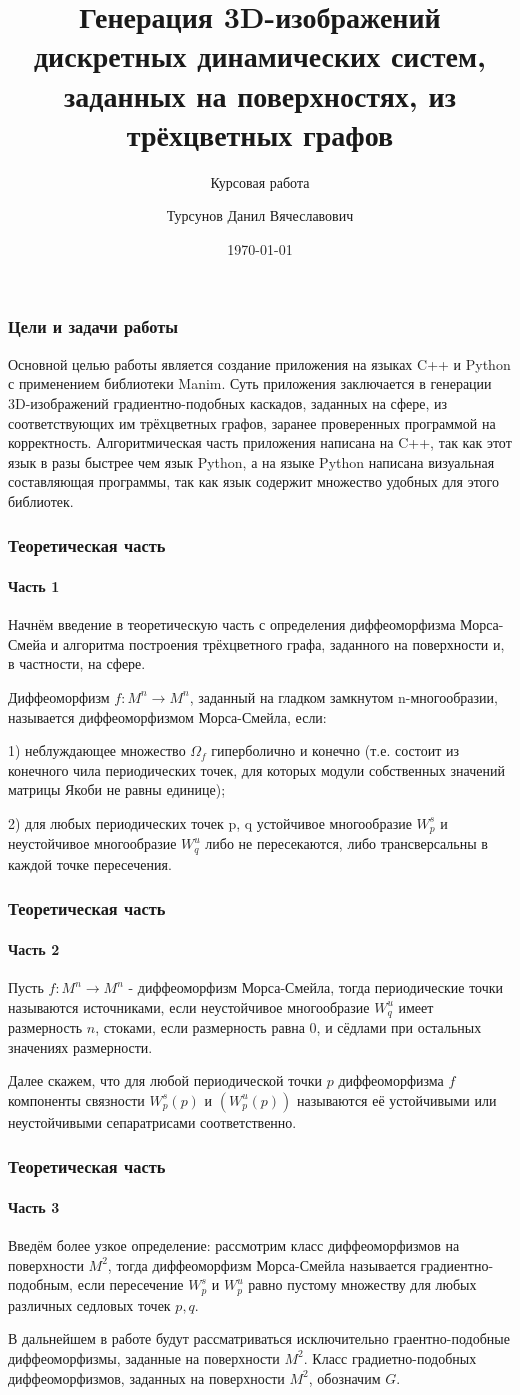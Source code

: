 \documentclass[aspectratio=169]{beamer}
\title[Заголовок]{Генерация 3D-изображений дискретных динамических систем, заданных на поверхностях, из трёхцветных графов}
\subtitle{Курсовая работа}
\author[Имя автора]{Турсунов Данил Вячеславович}
\institute{Образовательная программа "Фундаментальная математика"}
\date{\today}
\begin{document}

\frame[plain]{\titlepage}	%

\begin{frame}
\frametitle{Цели и задачи работы}
	Основной целью работы является создание приложения на языках C++ и Python с применением библиотеки Manim. Суть приложения заключается в генерации 3D-изображений градиентно-подобных каскадов, заданных на сфере, из соответствующих им трёхцветных графов, заранее проверенных программой на корректность. Алгоритмическая часть приложения написана на C++, так как этот язык в разы быстрее чем язык Python, а на языке Python написана визуальная составляющая программы, так как язык содержит множество удобных для этого библиотек.
\end{frame}
\begin{frame}
	\frametitle{Теоретическая часть}
	\framesubtitle{Часть 1}
	Начнём введение в теоретическую часть с определения диффеоморфизма Морса-Смейа и алгоритма построения трёхцветного графа, заданного на поверхности и, в частности, на сфере.
	\begin{definition}
		Диффеоморфизм $f: M^n \rightarrow M^n$, заданный на гладком замкнутом n-многообразии, называется диффеоморфизмом Морса-Смейла, если:
		\par 1) неблуждающее множество $\Omega_f$ гиперболично и конечно (т.е. состоит из конечного чила периодических точек, для которых модули собственных значений матрицы Якоби не равны единице);
		\par 2) для любых периодических точек p, q устойчивое многообразие $W^s_p$ и неустойчивое многообразие $W^u_q$ либо не пересекаются, либо трансверсальны в каждой точке пересечения.
	\end{definition}
\end{frame}
\begin{frame}
	\frametitle{Теоретическая часть}
	\framesubtitle{Часть 2}
	Пусть $f: M^n \rightarrow M^n$ - диффеоморфизм Морса-Смейла, тогда периодические точки называются источниками, если неустойчивое многообразие $W^u_q$ имеет размерность $n$, стоками, если  размерность равна $0$, и сёдлами при остальных значениях размерности.
	\par Далее скажем, что для любой периодической точки $p$ диффеоморфизма $f$ компоненты связности $W^s_p (p)$ и $(W^u_p (p))$ называются её устойчивыми или неустойчивыми сепаратрисами соответственно.
\end{frame}

\begin{frame}
	\frametitle{Теоретическая часть}
	\framesubtitle{Часть 3}
	Введём более узкое определение: рассмотрим класс диффеоморфизмов на поверхности $M^2$, тогда диффеоморфизм Морса-Смейла называется градиентно-подобным, если пересечение $W^s_p$ и $W^u_p$ равно пустому множеству для любых различных седловых точек $p,q$.
	\par В дальнейшем в работе будут рассматриваться исключительно граентно-подобные диффеоморфизмы, заданные на поверхности $M^2$. Класс градиетно-подобных диффеоморфизмов, заданных на поверхности $M^2$, обозначим $G$.
\end{frame}
\end{document}
